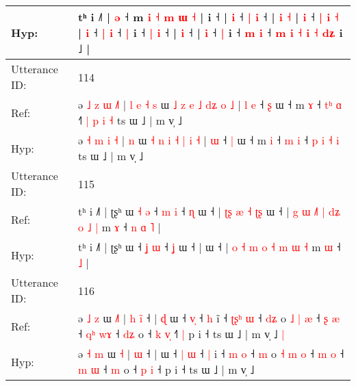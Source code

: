 \documentclass[10pt]{article}
\DeclareRobustCommand{\hl}[1]{{\textcolor{red}{#1}}}
\begin{document}
\begin{longtable}{ll}
Hyp: & tʰ i ˩˥ |\hl{}\hl{} \hl{}\hl{ə} ˧\hl{}\hl{} m\hl{}\hl{}\hl{} \hl{}\hl{i} \hl{˧} \hl{}\hl{m} \hl{ɯ} \hl{˧} |\hl{}\hl{}\hl{}\hl{}\hl{}\hl{}\hl{}\hl{} i ˧ |\hl{}\hl{} \hl{i} ˧ \hl{|} \hl{i} ˧\hl{}\hl{}\hl{}\hl{}\hl{}\hl{}\hl{}\hl{}\hl{}\hl{}\hl{}\hl{}\hl{} | \hl{}\hl{i} \hl{}\hl{˧} |\hl{}\hl{} \hl{i} ˧ \hl{|} \hl{i} \hl{˧} |\hl{}\hl{} \hl{i} ˧ \hl{|} \hl{i} ˧ \hl{|} i ˧ \hl{}\hl{|} \hl{i} ˧\hl{} |\hl{}\hl{} \hl{}\hl{i} ˧ |\hl{}\hl{} \hl{i} ˧ \hl{|} i ˧\hl{}\hl{} \hl{m} \hl{i} ˧ \hl{m} \hl{}\hl{i} \hl{˧} \hl{}\hl{}\hl{i} \hl{˧} \hl{}\hl{d}\hl{ʑ} i ˩ |
 \\
\midrule
Utterance ID: & 114 \\
Ref: & ə \hl{˩} \hl{z} \hl{ɯ} \hl{˩}\hl{˥} |\hl{ }\hl{l}\hl{ }\hl{e}\hl{ }\hl{˧} \hl{s} ɯ \hl{˩} \hl{z} \hl{e} \hl{˩} \hl{d}\hl{ʑ} \hl{o} \hl{˩} |\hl{ }\hl{l} \hl{e} ˧ \hl{ʂ} ɯ ˧ m \hl{ɤ} ˧ \hl{t}\hl{ʰ} \hl{ɑ} ˧\hl{˥} \hl{|} \hl{p} \hl{i} \hl{˧} ts ɯ ˩ | m v̩ ˩
 \\
Hyp: & ə \hl{˧} \hl{m} \hl{i} \hl{}\hl{˧} |\hl{}\hl{}\hl{}\hl{}\hl{}\hl{} \hl{n} ɯ \hl{˧} \hl{n} \hl{i} \hl{˧} \hl{}\hl{|} \hl{i} \hl{˧} |\hl{}\hl{} \hl{ɯ} ˧ \hl{|} ɯ ˧ m \hl{i} ˧ \hl{}\hl{m} \hl{i} ˧\hl{} \hl{p} \hl{i} \hl{˧} \hl{i} ts ɯ ˩ | m v̩ ˩
 \\
\midrule
Utterance ID: & 115 \\
Ref: & tʰ i ˩˥ | ʈʂʰ ɯ\hl{ }\hl{˧}\hl{ }\hl{ə} ˧ \hl{m} \hl{i} ˧ \hl{ɳ} ɯ ˧ |\hl{ }\hl{ʈ}\hl{ʂ}\hl{ }\hl{æ}\hl{ }\hl{˧}\hl{ }\hl{ʈ}\hl{ʂ} ɯ ˧ | \hl{g} \hl{ɯ} \hl{˩}\hl{˥} \hl{|} \hl{d}\hl{ʑ} \hl{o} \hl{˩} \hl{|} m \hl{ɤ} ˧\hl{ }\hl{n}\hl{ }\hl{ɑ} \hl{˥} |
 \\
Hyp: & tʰ i ˩˥ | ʈʂʰ ɯ\hl{}\hl{}\hl{}\hl{} ˧ \hl{ʝ} \hl{ɯ} ˧ \hl{ʝ} ɯ ˧ |\hl{}\hl{}\hl{}\hl{}\hl{}\hl{}\hl{}\hl{}\hl{}\hl{} ɯ ˧ | \hl{o} \hl{˧} \hl{}\hl{m} \hl{o} \hl{}\hl{˧} \hl{m} \hl{ɯ} \hl{˧} m \hl{ɯ} ˧\hl{}\hl{}\hl{}\hl{} \hl{˩} |
 \\
\midrule
Utterance ID: & 116 \\
Ref: & ə \hl{˩} \hl{z} ɯ \hl{˩}\hl{˥} |\hl{ }\hl{h} \hl{i}\hl{̃} ˧ |\hl{ }\hl{ɖ} ɯ ˧ \hl{}\hl{v}\hl{̩} ˧ \hl{h} i\hl{̃} ˧ \hl{ʈ}\hl{ʂ}\hl{ʰ} \hl{ɯ} ˧ \hl{d}\hl{ʑ} o \hl{˩} \hl{|} \hl{æ} ˧ \hl{ʂ} \hl{æ} ˧ \hl{q}\hl{ʰ} \hl{w}\hl{ɤ} ˧ \hl{d}\hl{ʑ} o ˧ \hl{k} \hl{v}\hl{̩} ˧\hl{˥}\hl{ }\hl{|} p i ˧ ts ɯ ˩ | m v̩ ˩\hl{ }\hl{|}
 \\
Hyp: & ə \hl{˧} \hl{m} ɯ \hl{}\hl{˧} |\hl{}\hl{} \hl{}\hl{ɯ} ˧ |\hl{}\hl{} ɯ ˧ \hl{|}\hl{ }\hl{ɯ} ˧ \hl{|} i\hl{} ˧ \hl{}\hl{}\hl{m} \hl{o} ˧ \hl{}\hl{m} o \hl{˧} \hl{m} \hl{o} ˧ \hl{m} \hl{o} ˧ \hl{}\hl{m} \hl{}\hl{ɯ} ˧ \hl{}\hl{m} o ˧ \hl{p} \hl{}\hl{i} ˧\hl{}\hl{}\hl{} p i ˧ ts ɯ ˩ | m v̩ ˩\hl{}\hl{}

\end{longtable}
\end{document}
